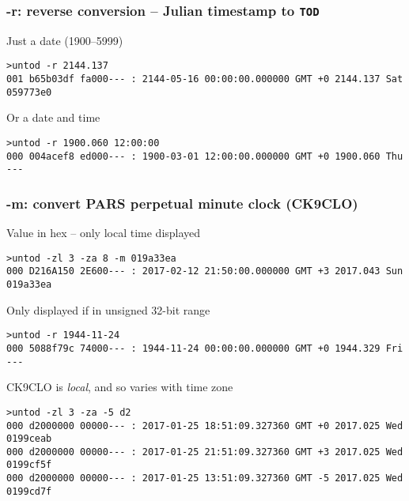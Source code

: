 \documentclass[10pt,xcolor=x11names]{beamer}
\newcommand{\tod}{\texttt{TOD}}
\begin{document}
\begin{frame}[fragile]
  \frametitle{-r: reverse conversion -- Julian timestamp to \tod{}}
  \begin{block}{Just a date (1900--5999)}
  \begin{lstlisting}
>untod -r 2144.137
001 b65b03df fa000--- : 2144-05-16 00:00:00.000000 GMT +0 2144.137 Sat 059773e0
  \end{lstlisting}
  \end{block}
  \begin{block}{Or a date and time}
  \begin{lstlisting}
>untod -r 1900.060 12:00:00
000 004acef8 ed000--- : 1900-03-01 12:00:00.000000 GMT +0 1900.060 Thu ---
  \end{lstlisting}
  \end{block}

\end{frame}

\begin{frame}[fragile]
  \frametitle{-m: convert PARS perpetual minute clock (CK9CLO)}
  \begin{block}{Value in hex -- only local time displayed}
  \begin{lstlisting}
>untod -zl 3 -za 8 -m 019a33ea
000 D216A150 2E600--- : 2017-02-12 21:50:00.000000 GMT +3 2017.043 Sun 019a33ea
  \end{lstlisting}
  \end{block}

  \begin{block}{Only displayed if in unsigned 32-bit range }
  \begin{lstlisting}
>untod -r 1944-11-24
000 5088f79c 74000--- : 1944-11-24 00:00:00.000000 GMT +0 1944.329 Fri ---
  \end{lstlisting}
  \end{block}

  \begin{block}{CK9CLO is \textit{local}, and so varies with time zone}
  \begin{lstlisting}
>untod -zl 3 -za -5 d2
000 d2000000 00000--- : 2017-01-25 18:51:09.327360 GMT +0 2017.025 Wed 0199ceab
000 d2000000 00000--- : 2017-01-25 21:51:09.327360 GMT +3 2017.025 Wed 0199cf5f
000 d2000000 00000--- : 2017-01-25 13:51:09.327360 GMT -5 2017.025 Wed 0199cd7f
  \end{lstlisting}
  \end{block}
\end{frame}
\end{document}

